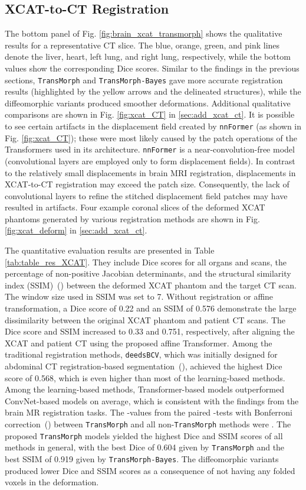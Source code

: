 \documentclass[times,twocolumn,final]{elsarticle}
\begin{document}
\subsection{XCAT-to-CT Registration}
The bottom panel of Fig. \ref{fig:brain_xcat_transmorph} shows the qualitative results for a representative CT slice. The blue, orange, green, and pink lines denote the liver, heart, left lung, and right lung, respectively, while the bottom values show the corresponding Dice scores. Similar to the findings in the previous sections, \texttt{TransMorph} and \texttt{TransMorph-Bayes} gave more accurate registration results (highlighted by the yellow arrows and the delineated structures), while the diffeomorphic variants produced smoother deformations. Additional qualitative comparisons are shown in Fig. \ref{fig:xcat_CT} in \ref{sec:add_xcat_ct}. It is possible to see certain artifacts in the displacement field created by \texttt{nnFormer} (as shown in Fig. \ref{fig:xcat_CT}); these were most likely caused by the patch operations of the Transformers used in its architecture. \texttt{nnFormer} is a near-convolution-free model (convolutional layers are employed only to form displacement fields). In contrast to the relatively small displacements in brain MRI registration, displacements in XCAT-to-CT registration may exceed the patch size. Consequently, the lack of convolutional layers to refine the stitched displacement field patches may have resulted in artifacts. Four example coronal slices of the deformed XCAT phantoms generated by various registration methods are shown in Fig. \ref{fig:xcat_deform} in \ref{sec:add_xcat_ct}.

The quantitative evaluation results are presented in Table \ref{tab:table_res_XCAT}. They include Dice scores for all organs and scans, the percentage of non-positive Jacobian determinants, and the structural similarity index (SSIM)~(\cite{wang2004image}) between the deformed XCAT phantom and the target CT scan. The window size used in SSIM was set to 7. Without registration or affine transformation, a Dice score of 0.22 and an SSIM of 0.576 demonstrate the large dissimilarity between the original XCAT phantom and patient CT scans. The Dice score and SSIM increased to 0.33 and 0.751, respectively, after aligning the XCAT and patient CT using the proposed affine Transformer. Among the traditional registration methods, \texttt{deedsBCV}, which was initially designed for abdominal CT registration-based segmentation~(\cite{heinrich2015multi}), achieved the highest Dice score of 0.568, which is even higher than most of the learning-based methods. Among the learning-based methods, Transformer-based models outperformed ConvNet-based models on average, which is consistent with the findings from the brain MR registration tasks. The -values from the paired -tests with Bonferroni correction~(\cite{armstrong2014use}) between \texttt{TransMorph} and all non-\texttt{TransMorph} methods were . The proposed \texttt{TransMorph} models yielded the highest Dice and SSIM scores of all methods in general, with the best Dice of 0.604 given by \texttt{TransMorph} and the best SSIM of 0.919 given by \texttt{TransMorph-Bayes}. The diffeomorphic variants produced lower Dice and SSIM scores as a consequence of not having any folded voxels in the deformation.
\end{document}
